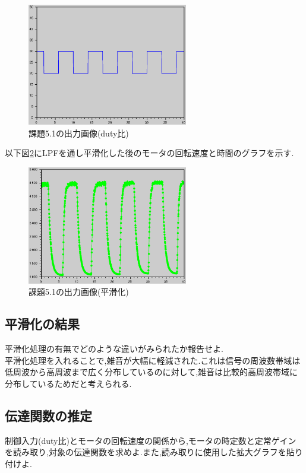 \documentclass{jarticle}
\begin{document}
\begin{figure}[H]
\begin{center}
\includegraphics[width=7.0cm]{images/kadai5-1-2.eps}
\caption{課題5.1の出力画像(duty比)}
\label{fig:kadai5-1-2}
\end{center}
\end{figure}


以下図\ref{fig:kadai5-1-3}にLPFを通し平滑化した後のモータの回転速度と時間のグラフを示す.

\begin{figure}[H]
\begin{center}
\includegraphics[width=7.0cm]{images/kadai5-1-3.eps}
\caption{課題5.1の出力画像(平滑化)}
\label{fig:kadai5-1-3}
\end{center}
\end{figure}

\subsection{平滑化の結果}
平滑化処理の有無でどのような違いがみられたか報告せよ. \\

平滑化処理を入れることで,雑音が大幅に軽減された.これは信号の周波数帯域は低周波から高周波まで広く分布しているのに対して,雑音は比較的高周波帯域に分布しているためだと考えられる.

\subsection{伝達関数の推定}
制御入力(duty比)とモータの回転速度の関係から,モータの時定数と定常ゲインを読み取り,対象の伝達関数を求めよ.また,読み取りに使用した拡大グラフを貼り付けよ. \\
\end{document}
